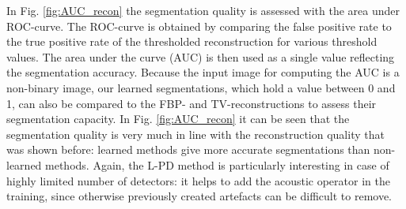\documentclass[journal]{IEEEtran}
\begin{document}
In Fig. \ref{fig:AUC_recon} the segmentation quality is assessed with the area under ROC-curve. The ROC-curve is obtained by comparing the false positive rate to the true positive rate of the thresholded reconstruction for various threshold values. The area under the curve (AUC) is then used as a single value reflecting the segmentation accuracy. Because the input image for computing the AUC is a non-binary image, our learned segmentations, which hold a value between 0 and 1, can also be compared to the FBP- and TV-reconstructions to assess their segmentation capacity. In Fig. \ref{fig:AUC_recon} it can be seen that the segmentation quality is very much in line with the reconstruction quality that was shown before: learned methods give more accurate segmentations than non-learned methods. Again, the L-PD method is particularly interesting in case of highly limited number of detectors: it helps to add the acoustic operator in the training, since otherwise previously created artefacts can be difficult to remove.
\end{document}

